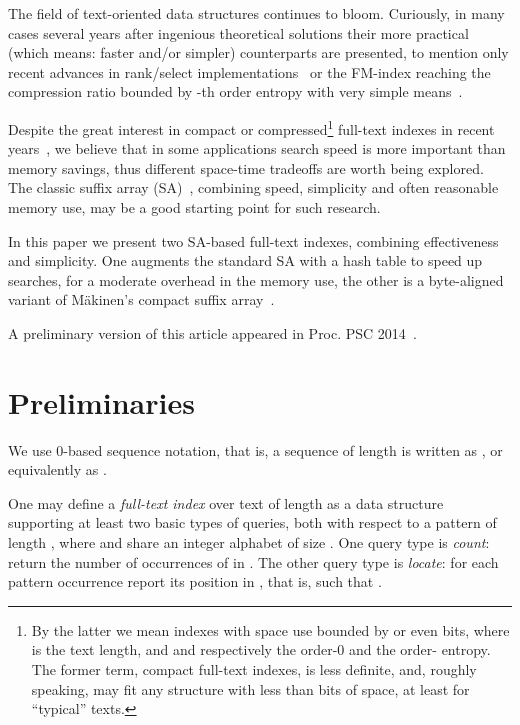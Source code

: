 \documentclass{cai}
\begin{document}
The field of text-oriented data structures continues to bloom.
Curiously, in many cases several years after ingenious theoretical solutions
their more practical (which means: faster and/or simpler) counterparts are presented, 
to mention only recent advances in rank/select implementations~\cite{GP14} 
or the FM-index reaching the compression ratio bounded by -th order
entropy with very simple means~\cite{DBLP:conf/spire/KarkkainenP11}.

Despite the great interest in compact or compressed\footnote{By the latter we mean indexes with space use bounded by  or even 
 bits,  where  is the text length,
and  and  respectively the order-0 and the order- entropy.
The former term, compact full-text indexes, is less definite, 
and, roughly speaking, may fit any structure with less than  
bits of space, at least for ``typical'' texts.}
full-text indexes in recent years~\cite{NMacmcs06}, we believe that in 
some applications search speed is more important than memory savings, thus 
different space-time tradeoffs are worth being explored.
The classic suffix array (SA)~\cite{MM90}, combining speed, simplicity and often 
reasonable memory use, may be a good starting point for such research.

In this paper we present two SA-based full-text indexes, combining effectiveness 
and simplicity.
One augments the standard SA with a hash table to speed up searches, 
for a moderate overhead in the memory use, 
the other is a byte-aligned variant of M{\"a}kinen's compact 
suffix array~\cite{DBLP:conf/cpm/Makinen00,DBLP:journals/fuin/Makinen03}.

A preliminary version of this article appeared in Proc. PSC 2014~\cite{GR14}.

\section{Preliminaries}
\label{sec:prelim}

We use 0-based sequence notation, that is, a sequence  of length  
is written as , or equivalently as .

One may define a {\em full-text index} over text  of length  
as a data structure supporting at least two basic types of queries, 
both with respect to a pattern  of length , 
where  and  share an integer alphabet of size .
One query type is {\em count}: return the number  of occurrences 
of  in .
The other query type is {\em locate}: for each pattern occurrence 
report its position in , that is, such  that .
\end{document}
